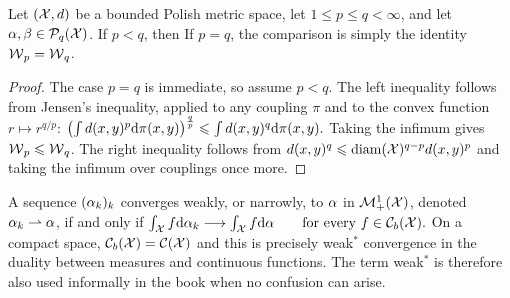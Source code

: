 \begin{prop}\label{prop-comp-wass-p}
Let $(\mathcal{X},d)$ be a bounded Polish metric space, let $1\leq p\leq q<\infty$, and let $\alpha,\beta\in\mathcal{P}_q(\mathcal{X})$. If $p<q$, then
If $p=q$, the comparison is simply the identity $\operatorname{\mathcal{W}}_p=\operatorname{\mathcal{W}}_q$.
\end{prop}
\begin{proof}
The case $p=q$ is immediate, so assume $p<q$.
The left inequality follows from Jensen's inequality, applied to any coupling $\pi$ and to the convex function $r\mapsto r^{q/p}$: \(\left( \int d(x,y)^{p} \mathrm{d}\pi(x,y) \right)^{\frac{q}{p}} \leqslant \int d(x,y)^{q} \mathrm{d}\pi(x,y).\)
Taking the infimum gives $\operatorname{\mathcal{W}}_p\leqslant\operatorname{\mathcal{W}}_q$. The right inequality follows from
\(d(x,y)^q \leqslant \operatorname{diam}(\mathcal{X})^{q-p} d(x,y)^p\)
and taking the infimum over couplings once more.
\end{proof}
\begin{defn}\label{dfn-weak-conv}
A sequence $(\alpha_k)_k$ converges weakly, or narrowly, to $\alpha$ in $\mathcal{M}_+^1(\mathcal{X})$, denoted $\alpha_k \rightharpoonup \alpha$, if and only if
\(\int_{\mathcal{X}} f\mathrm{d}\alpha_k\longrightarrow\int_{\mathcal{X}} f\mathrm{d}\alpha \qquad\text{for every }f\in\mathcal{C}_b(\mathcal{X}).\)
On a compact space, $\mathcal{C}_b(\mathcal{X})=\mathcal{C}(\mathcal{X})$ and this is precisely weak$^*$ convergence in the duality between measures and continuous functions. The term weak$^*$ is therefore also used informally in the book when no confusion can arise.
\end{defn}
